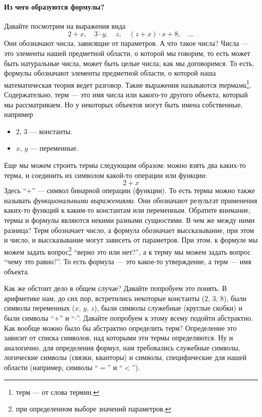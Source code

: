\paragraph{Из чего образуются формулы?} Давайте посмотрим на выражения вида
$$
    2 + x, \quad 3 \cdot y, \quad z, \quad (z + x) \cdot x + 8, \quad \ldots
$$
Они обозначают числа, зависящие от параметров.
А что такое числа?
Числа --- это элементы нашей предметной области, о которой мы говорим, то есть может быть натуральные числа, может быть целые числа, как мы договоримся.
То есть, формулы обозначают элементы предметной области, о которой наша математическая теория ведет разговор.
Такие выражения называются {\it термами}\footnote{терм --- от слова термин.}.
Содержательно, терм --- это имя числа или какого-то другого объекта, который мы рассматриваем.
Но у некоторых объектов могут быть имена собственные, например
\begin{itemize}
    \item $2$, $3$ --- константы.
    \item $x$, $y$ --- переменные.
\end{itemize}
Еще мы можем строить термы следующим образом: можно взять два каких-то терма, и соединить их символом какой-то операции или функции:
$$
    2 + x
$$
Здесь \enquote{$+$} --- символ бинарной операции (функции).
То есть термы можно также называть {\it функциональными выражениями}.
Они обозначают результат применения каких-то функций к каким-то константам или переменным.
Обратите внимание, термы и формулы являются некими разными сущностями.
В чем же между ними разница?
Терм обозначает число, а формула обозначает выссказывание, при этом и число, и выссказывание могут зависеть от параметров.
При этом, к формуле мы можем задать вопрос\footnote{при определенном выборе значений параметров.} \enquote{верно это или нет?}, а к терму мы можем задать вопрос \enquote{чему это равно?}.
То есть формула --- это какое-то утверждение, а терм --- имя объекта.

Как же обстоит дело в общем случае?
Давайте попробуем это понять.
В арифметике нам, до сих пор, встретились некоторые константы (2, 3, 8), были символы переменных ($x$, $y$, $z$), были символы служебные (круглые скобки) и были символы \enquote{$+$} и \enquote{$\cdot$}.
Давайте попробуем к этому всему подойти абстрактно.
Как вообще можно было бы абстрактно определить терм?
Определение это зависит от списка символов, над которыми эти термы определяются.
Ну и аналогично, для определения формул, нам требовались служебные символы, логические символы (связки, кванторы) и символы, специфические для нашей области (например, символы \enquote{$=$} и \enquote{$<$}).

